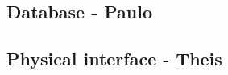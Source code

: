 \subsection{Database - Paulo}
%			
%					
%	
%	
%	
%	
%	
%	
%	
\subsection{Physical interface - Theis}
%			
%					
%	
%	
%	
%	
%	
%	
%	
